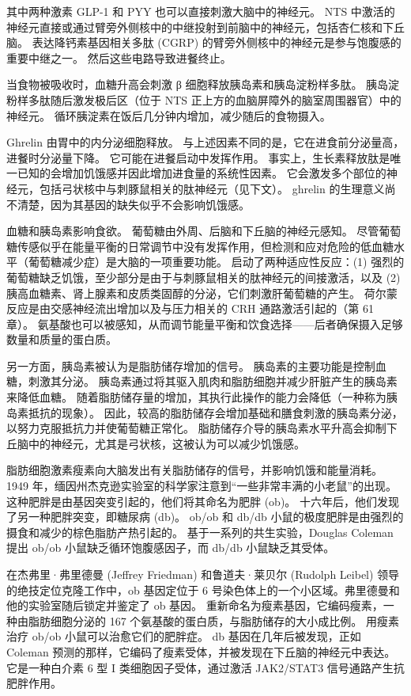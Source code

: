 其中两种激素 GLP-1 和 PYY 也可以直接刺激大脑中的神经元。 NTS 中激活的神经元直接或通过臂旁外侧核中的中继投射到前脑中的神经元，包括杏仁核和下丘脑。 表达降钙素基因相关多肽 (CGRP) 的臂旁外侧核中的神经元是参与饱腹感的重要中继之一。 然后这些电路导致进餐终止。

当食物被吸收时，血糖升高会刺激 β 细胞释放胰岛素和胰岛淀粉样多肽。 胰岛淀粉样多肽随后激发极后区（位于 NTS 正上方的血脑屏障外的脑室周围器官）中的神经元。 循环胰淀素在饭后几分钟内增加，减少随后的食物摄入。

Ghrelin 由胃中的内分泌细胞释放。 与上述因素不同的是，它在进食前分泌量高，进餐时分泌量下降。 它可能在进餐启动中发挥作用。 事实上，生长素释放肽是唯一已知的会增加饥饿感并因此增加进食量的系统性因素。 它会激发多个部位的神经元，包括弓状核中与刺豚鼠相关的肽神经元（见下文）。 ghrelin 的生理意义尚不清楚，因为其基因的缺失似乎不会影响饥饿感。

血糖和胰岛素影响食欲。 葡萄糖由外周、后脑和下丘脑的神经元感知。 尽管葡萄糖传感似乎在能量平衡的日常调节中没有发挥作用，但检测和应对危险的低血糖水平（葡萄糖减少症）是大脑的一项重要功能。 启动了两种适应性反应：(1) 强烈的葡萄糖缺乏饥饿，至少部分是由于与刺豚鼠相关的肽神经元的间接激活，以及 (2) 胰高血糖素、肾上腺素和皮质类固醇的分泌，它们刺激肝葡萄糖的产生。 荷尔蒙反应是由交感神经流出增加以及与压力相关的 CRH 通路激活引起的（第 61 章）。 氨基酸也可以被感知，从而调节能量平衡和饮食选择——后者确保摄入足够数量和质量的蛋白质。

另一方面，胰岛素被认为是脂肪储存增加的信号。 胰岛素的主要功能是控制血糖，刺激其分泌。 胰岛素通过将其驱入肌肉和脂肪细胞并减少肝脏产生的胰岛素来降低血糖。 随着脂肪储存量的增加，其执行此操作的能力会降低（一种称为胰岛素抵抗的现象）。 因此，较高的脂肪储存会增加基础和膳食刺激的胰岛素分泌，以努力克服抵抗力并使葡萄糖正常化。 脂肪储存介导的胰岛素水平升高会抑制下丘脑中的神经元，尤其是弓状核，这被认为可以减少饥饿感。

脂肪细胞激素瘦素向大脑发出有关脂肪储存的信号，并影响饥饿和能量消耗。 1949 年，缅因州杰克逊实验室的科学家注意到“一些非常丰满的小老鼠”的出现。 这种肥胖是由基因突变引起的，他们将其命名为肥胖 (ob)。 十六年后，他们发现了另一种肥胖突变，即糖尿病 (db)。 ob/ob 和 db/db 小鼠的极度肥胖是由强烈的摄食和减少的棕色脂肪产热引起的。 基于一系列的共生实验，Douglas Coleman 提出 ob/ob 小鼠缺乏循环饱腹感因子，而 db/db 小鼠缺乏其受体。

在杰弗里·弗里德曼 (Jeffrey Friedman) 和鲁道夫·莱贝尔 (Rudolph Leibel) 领导的绝技定位克隆工作中，ob 基因定位于 6 号染色体上的一个小区域。弗里德曼和他的实验室随后锁定并鉴定了 ob 基因。 重新命名为瘦素基因，它编码瘦素，一种由脂肪细胞分泌的 167 个氨基酸的蛋白质，与脂肪储存的大小成比例。 用瘦素治疗 ob/ob 小鼠可以治愈它们的肥胖症。 db 基因在几年后被发现，正如 Coleman 预测的那样，它编码了瘦素受体，并被发现在下丘脑的神经元中表达。 它是一种白介素 6 型 I 类细胞因子受体，通过激活 JAK2/STAT3 信号通路产生抗肥胖作用。

